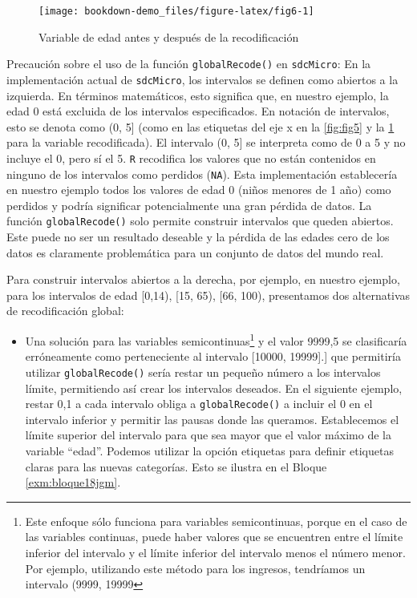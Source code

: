 \documentclass[]{book}
\providecommand{\tightlist}{%
  \setlength{\itemsep}{0pt}\setlength{\parskip}{0pt}}
\theoremstyle{definition}
\theoremstyle{definition}
\theoremstyle{definition}
\theoremstyle{definition}
\theoremstyle{remark}
\begin{document}
\begin{figure}
\texttt{[image: bookdown-demo\_files/figure-latex/fig6-1]} \caption{Variable de edad antes y después de la recodificación}\label{fig:fig6}
\end{figure}

Precaución sobre el uso de la función \texttt{globalRecode()} en \texttt{sdcMicro}: En la implementación actual de \texttt{sdcMicro}, los intervalos se definen como abiertos a la izquierda. En términos matemáticos, esto significa que, en nuestro ejemplo, la edad 0 está excluida de los intervalos especificados. En notación de intervalos, esto se denota como (0, 5{]} (como en las etiquetas del eje x en la \ref{fig:fig5} y la \ref{fig:fig6} para la variable recodificada). El intervalo (0, 5{]} se interpreta como de 0 a 5 y no incluye el 0, pero sí el 5. \texttt{R} recodifica los valores que no están contenidos en ninguno de los intervalos como perdidos (\texttt{NA}). Esta implementación establecería en nuestro ejemplo todos los valores de edad 0 (niños menores de 1 año) como perdidos y podría significar potencialmente una gran pérdida de datos. La función \texttt{globalRecode()} solo permite construir intervalos que queden abiertos. Este puede no ser un resultado deseable y la pérdida de las edades cero de los datos es claramente problemática para un conjunto de datos del mundo real.

Para construir intervalos abiertos a la derecha, por ejemplo, en nuestro ejemplo, para los intervalos de edad {[}0,14), {[}15, 65), {[}66, 100), presentamos dos alternativas de recodificación global:

\begin{itemize}
\tightlist
\item
  Una solución para las variables semicontinuas\footnote{Este enfoque sólo funciona para variables semicontinuas, porque en el caso de las variables continuas, puede haber valores que se encuentren entre el límite inferior del intervalo y el límite inferior del intervalo menos el número menor. Por ejemplo, utilizando este método para los ingresos, tendríamos un intervalo (9999, 19999} y el valor 9999,5 se clasificaría erróneamente como perteneciente al intervalo {[}10000, 19999{]}.{]} que permitiría utilizar \texttt{globalRecode()} sería restar un pequeño número a los intervalos límite, permitiendo así crear los intervalos deseados. En el siguiente ejemplo, restar 0,1 a cada intervalo obliga a \texttt{globalRecode()} a incluir el 0 en el intervalo inferior y permitir las pausas donde las queramos. Establecemos el límite superior del intervalo para que sea mayor que el valor máximo de la variable ``edad''. Podemos utilizar la opción etiquetas para definir etiquetas claras para las nuevas categorías. Esto se ilustra en el Bloque \ref{exm:bloque18jgm}.
\end{itemize}
\end{document}
